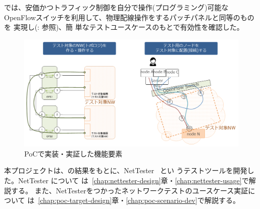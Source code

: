 \lopjc では、安価かつトラフィック制御を自分で操作(プログラミング)可能な
OpenFlowスイッチを利用して、物理配線操作をするパッチパネルと同等のものを
実現し(: 参照)、簡
単なテストユースケースのもとで有効性を確認した。

\begin{figure}[h]
 \centering
 \includegraphics[scale=0.5]{img/poc-l1patchpj.png}
 \caption{\lopj PoCで実装・実証した機能要素}
 \label{fig:poc-l1patchpj}
\end{figure}



 本プロジェクトは、\lopj の結果をもとに、NetTester~\cite{nettester} とい
 うテストツールを開発した。NetTester について
 は~\ref{chap:nettester-design}章・\ref{chap:nettester-usage}で解説する。
 また、NetTesterをつかったネットワークテストのユースケース実証について
 は~\ref{chap:poc-target-design}章・\ref{chap:poc-scenario-dev}で解説する。


